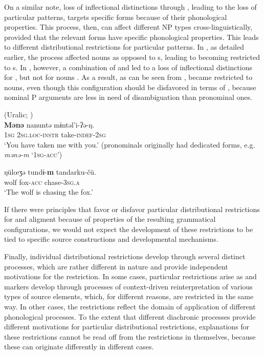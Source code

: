 \documentclass[output=paper]{langsci/langscibook}
\begin{document}
On a similar note, loss of inflectional distinctions through ,
leading to the loss of particular  patterns, targets specific
forms because of their phonological properties. This process, then, can affect different NP types cross-linguistically,
provided that the relevant forms have specific phonological
properties. This leads to different distributional
restrictions for particular  patterns. In , as
detailed earlier, the process affected nouns as
opposed to s, leading to   becoming
restricted to s. In  , however, a combination of  and
 led to a loss of inflectional
distinctions for , but not for nouns
. As a result, as can be seen from
,   became
restricted to nouns, even though this configuration should be
disfavored in terms of , because nominal P arguments are less in need
of disambiguation than pronominal ones.

\ea\label{nganasan}
 (Uralic; )\\
  \ea
    \gll \textbf{{Mənə}} nanuntə m​ɨntəl'i-ʔə-ŋ.\\
    1\textsc{sg} 2\textsc{sg.loc-instr} take-\textsc{indef}-2\textsc{sg}\\
    \glt `You have taken me with you.' (pronominals originally had dedicated  forms, e.g. {\em mənə-m} `1\textsc{sg-acc}')
    
  \ex
    \gll ŋül{\oe}ʒə tund​ɨ-\textbf{{m}} tandarku-čü.\\
    wolf fox-\textsc{acc} chase-3\textsc{sg.a}\\
    \glt `The wolf is chasing the fox.'
    
  \z
\z

If there were principles that favor or disfavor particular distributional
restrictions for  and  aligment because of properties of the
resulting grammatical configurations, we would not expect the development of
these restrictions to be tied to specific source
constructions and developmental mechanisms. 

Finally, individual distributional restrictions develop through several distinct
processes, which are rather different in nature and provide
independent motivations for the restriction. In some cases, particular
restrictions arise as  and   markers develop
through processes of context-driven reinterpretation of various types
of source elements, which, for different reasons, are restricted in the same way. In other cases, the restrictions reflect the domain of
application of different phonological processes. To the extent that different diachronic processes provide different
motivations for particular distributional restrictions, 
explanations for these restrictions cannot be read off from the
restrictions in themselves, because these can originate differently in
different cases.
\end{document}
